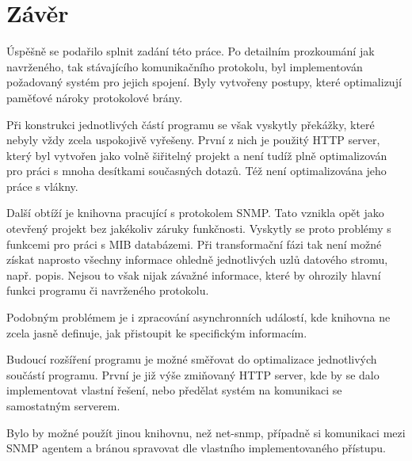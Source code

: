\chapter{Závěr}
\label{kap_zaver}
Úspěšně se podařilo splnit zadání této práce. Po detailním prozkoumání jak navrženého, tak stávajícího komunikačního protokolu, byl
implementován požadovaný systém pro jejich spojení. Byly vytvořeny postupy, které optimalizují paměťové nároky protokolové brány.

Při konstrukci jednotlivých částí programu se však vyskytly překážky, které nebyly vždy zcela uspokojivě vyřešeny. První z nich je
použitý HTTP server, který byl vytvořen jako volně šiřitelný projekt a není tudíž plně optimalizován pro práci s mnoha desítkami
současných dotazů. Též není optimalizována jeho práce s vlákny.

Další obtíží je knihovna pracující s protokolem SNMP. Tato vznikla opět jako otevřený projekt bez jakékoliv záruky funkčnosti.
Vyskytly se proto problémy s funkcemi pro práci s MIB databázemi. Při transformační fázi tak není možné získat naprosto všechny 
informace ohledně jednotlivých uzlů datového stromu, např. popis. Nejsou to však nijak závažné informace, které by ohrozily
hlavní funkci programu či navrženého protokolu.

Podobným problémem je i zpracování asynchronních událostí, kde knihovna ne zcela jasně definuje, jak přistoupit ke specifickým informacím.

Budoucí rozšíření programu je možné směřovat do optimalizace jednotlivých součástí programu. První je již výše zmiňovaný HTTP server,
kde by se dalo implementovat vlastní řešení, nebo předělat systém na komunikaci se samostatným serverem.

Bylo by možné použít jinou knihovnu, než net-snmp, případně si komunikaci mezi SNMP agentem a bránou spravovat dle vlastního implementovaného
přístupu.



